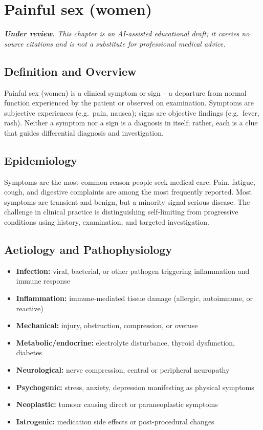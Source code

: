 \chapter{Painful sex (women)}

\medskip
\noindent\textit{\textbf{Under review.} This chapter is an AI-assisted educational draft; it carries no source citations and is not a substitute for professional medical advice.}

\section*{Definition and Overview}
Painful sex (women) is a clinical symptom or sign -- a departure from normal function experienced by the patient or observed on examination. Symptoms are subjective experiences (e.g.\ pain, nausea); signs are objective findings (e.g.\ fever, rash). Neither a symptom nor a sign is a diagnosis in itself; rather, each is a clue that guides differential diagnosis and investigation.

\section*{Epidemiology}
Symptoms are the most common reason people seek medical care. Pain, fatigue, cough, and digestive complaints are among the most frequently reported. Most symptoms are transient and benign, but a minority signal serious disease. The challenge in clinical practice is distinguishing self-limiting from progressive conditions using history, examination, and targeted investigation.

\section*{Aetiology and Pathophysiology}
\begin{itemize}
    \item \textbf{Infection:} viral, bacterial, or other pathogen triggering inflammation and immune response
    \item \textbf{Inflammation:} immune-mediated tissue damage (allergic, autoimmune, or reactive)
    \item \textbf{Mechanical:} injury, obstruction, compression, or overuse
    \item \textbf{Metabolic/endocrine:} electrolyte disturbance, thyroid dysfunction, diabetes
    \item \textbf{Neurological:} nerve compression, central or peripheral neuropathy
    \item \textbf{Psychogenic:} stress, anxiety, depression manifesting as physical symptoms
    \item \textbf{Neoplastic:} tumour causing direct or paraneoplastic symptoms
    \item \textbf{Iatrogenic:} medication side effects or post-procedural changes
\end{itemize}

